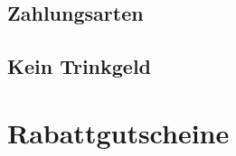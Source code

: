 
\subsection{Zahlungsarten} %
\label{sub:Zahlungsarten}


\subsection{Kein Trinkgeld} %
\label{sub:Kein Trinkgeld}


\section{Rabattgutscheine} %
\label{sec:Rabattgutscheine}



